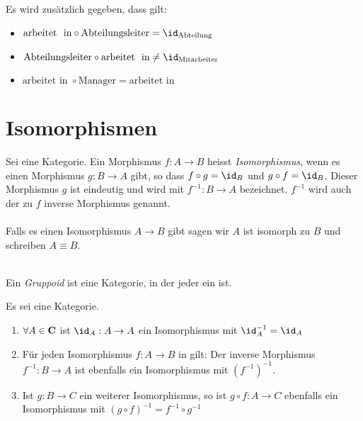 \documentclass{article}
\begin{document}
	 \begin{bsp}[Datenbanken]
		  \cite[Beispiel 2.2.33]{Bra} \\
		  \\
		 Es wird zus\"atzlich gegeben, dass gilt:
		 \begin{itemize}
			 \item \( \text{arbeitet \ in} \circ \text{Abteilungsleiter}= \id_\text{Abteilung}  \)
			 \item \( \text{Abteilungsleiter} \circ \text{arbeitet \ in} \neq \id_\text{Mitarbeiter}  \)
			 \item \( \text{arbeitet \ in }  \circ \text{Manager} = \text{arbeitet \ in } \)
		 \end{itemize}
	 \end{bsp}
	\newpage
	\section{Isomorphismen}
		
		\begin{defi}[Isomorphismus ]
		 \cite[Definition 2.3.1]{Bra}
		Sei \CatC eine Kategorie. Ein Morphismus \( f: A \to B  \) heisst  \emph{Isomorphismus}, wenn es einen Morphismus \( g: B \to A \) gibt, so dass \( f \circ g  = \id_B \) und \( g \circ f = \id_B \). 
		Dieser Morphismus \( g \) ist eindeutig und wird mit \( f^{-1} :B \to A \) bezeichnet.
		\(f^{-1} \) wird auch der zu \( f \)  inverse Morphismus genannt.\\
		 \\
		Falls es einen Isomorphismus \( A \to B \) gibt sagen wir \( A \) ist isomorph zu \( B \) und schreiben \( A \equiv B \).
		\end{defi}
		
		
		 \begin{defi}[Gruppoid]
		  \cite[Beispiel 2.2.34]{Bra} \\
		 Ein \emph{Gruppoid} ist eine Kategorie, in der jeder \Mor ein \Iso ist.
		  \end{defi}
		  
		  \begin{lem}
		   \cite[Lemma 2.3.9]{Bra}
		  Es sei \CatC eine Kategorie.
		  \begin{enumerate}
			  \item \( \forall A \in \mathbf{C} \) ist \( \id_A :A \to A  \) ein Isomorphismus mit \( \id_A^{-1}=\id_A \)
			  \item F\"ur jeden Isomorphismus \( f: A \to B \) in \CatC gilt: Der inverse Morphismus \(f^{-1}: B \to A \) ist ebenfalls ein Isomorphismus mit \( \left( f^{-1} \right)^{-1} \).
			  \item Ist \(g: B \to C \) ein weiterer Isomorphismus, so ist \( g \circ f :A \to C \) ebenfalls ein Isomorphismus mit \( \left( g \circ f \right)^{-1} =f^{-1} \circ g^{-1} \)  
		  \end{enumerate}
		  	\end{lem}
		  	
\end{document}
